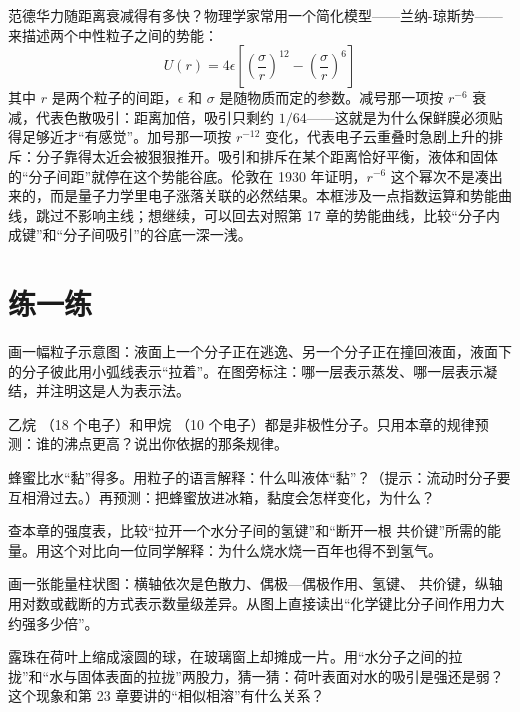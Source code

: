 \begin{tiaozhan}
范德华力随距离衰减得有多快？物理学家常用一个简化模型——兰纳-琼斯势——来描述两个中性粒子之间的势能：
\[
U(r) = 4\epsilon\left[\left(\frac{\sigma}{r}\right)^{12} - \left(\frac{\sigma}{r}\right)^{6}\right]
\]
其中 $r$ 是两个粒子的间距，$\epsilon$ 和 $\sigma$ 是随物质而定的参数。减号那一项按 $r^{-6}$ 衰减，代表色散吸引：距离加倍，吸引只剩约 $1/64$——这就是为什么保鲜膜必须贴得足够近才“有感觉”。加号那一项按 $r^{-12}$ 变化，代表电子云重叠时急剧上升的排斥：分子靠得太近会被狠狠推开。吸引和排斥在某个距离恰好平衡，液体和固体的“分子间距”就停在这个势能谷底。伦敦在 1930 年证明，$r^{-6}$ 这个幂次不是凑出来的，而是量子力学里电子涨落关联的必然结果。本框涉及一点指数运算和势能曲线，跳过不影响主线；想继续，可以回去对照第 17 章的势能曲线，比较“分子内成键”和“分子间吸引”的谷底一深一浅。
\end{tiaozhan}

\section*{练一练}

\begin{sikaoti}
\item 画一幅粒子示意图：液面上一个分子正在逃逸、另一个分子正在撞回液面，液面下的分子彼此用小弧线表示“拉着”。在图旁标注：哪一层表示蒸发、哪一层表示凝结，并注明这是人为表示法。
\item 乙烷 （18 个电子）和甲烷 （10 个电子）都是非极性分子。只用本章的规律预测：谁的沸点更高？说出你依据的那条规律。
\item 蜂蜜比水“黏”得多。用粒子的语言解释：什么叫液体“黏”？（提示：流动时分子要互相滑过去。）再预测：把蜂蜜放进冰箱，黏度会怎样变化，为什么？
\item 查本章的强度表，比较“拉开一个水分子间的氢键”和“断开一根  共价键”所需的能量。用这个对比向一位同学解释：为什么烧水烧一百年也得不到氢气。
\item 画一张能量柱状图：横轴依次是色散力、偶极—偶极作用、氢键、 共价键，纵轴用对数或截断的方式表示数量级差异。从图上直接读出“化学键比分子间作用力大约强多少倍”。
\item 露珠在荷叶上缩成滚圆的球，在玻璃窗上却摊成一片。用“水分子之间的拉拢”和“水与固体表面的拉拢”两股力，猜一猜：荷叶表面对水的吸引是强还是弱？这个现象和第 23 章要讲的“相似相溶”有什么关系？
\end{sikaoti}
